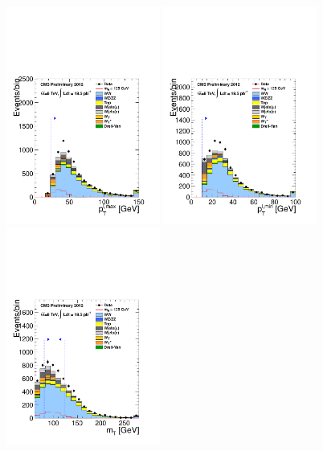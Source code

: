 \begin{figure}[htp]
\centering
\includegraphics[width=0.45\textwidth]{figures/hww_analysis16_125_ALL_of_0j_pt1.pdf}
\includegraphics[width=0.45\textwidth]{figures/hww_analysis16_125_ALL_of_0j_pt2.pdf}
\includegraphics[width=0.45\textwidth]{figures/hww_analysis16_125_ALL_of_0j_mt.pdf}

\end{figure}
